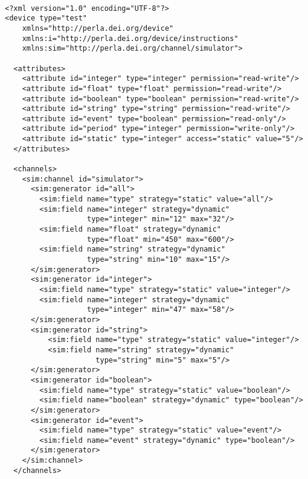 ~\\
\lstset{language=XML}
\begin{lstlisting}
<?xml version="1.0" encoding="UTF-8"?>
<device type="test"
    xmlns="http://perla.dei.org/device"
    xmlns:i="http://perla.dei.org/device/instructions"
    xmlns:sim="http://perla.dei.org/channel/simulator">

  <attributes>
    <attribute id="integer" type="integer" permission="read-write"/>
    <attribute id="float" type="float" permission="read-write"/>
    <attribute id="boolean" type="boolean" permission="read-write"/>
    <attribute id="string" type="string" permission="read-write"/>
    <attribute id="event" type="boolean" permission="read-only"/>
    <attribute id="period" type="integer" permission="write-only"/>
    <attribute id="static" type="integer" access="static" value="5"/>
  </attributes>

  <channels>
    <sim:channel id="simulator">
      <sim:generator id="all">
        <sim:field name="type" strategy="static" value="all"/>
        <sim:field name="integer" strategy="dynamic"
                   type="integer" min="12" max="32"/>
        <sim:field name="float" strategy="dynamic"
                   type="float" min="450" max="600"/>
        <sim:field name="string" strategy="dynamic"
                   type="string" min="10" max="15"/>
      </sim:generator>
      <sim:generator id="integer">
        <sim:field name="type" strategy="static" value="integer"/>
        <sim:field name="integer" strategy="dynamic"
                   type="integer" min="47" max="58"/>
      </sim:generator>
      <sim:generator id="string">
          <sim:field name="type" strategy="static" value="integer"/>
          <sim:field name="string" strategy="dynamic"
                     type="string" min="5" max="5"/>
      </sim:generator>
      <sim:generator id="boolean">
        <sim:field name="type" strategy="static" value="boolean"/>
        <sim:field name="boolean" strategy="dynamic" type="boolean"/>
      </sim:generator>
      <sim:generator id="event">
        <sim:field name="type" strategy="static" value="event"/>
        <sim:field name="event" strategy="dynamic" type="boolean"/>
      </sim:generator>
    </sim:channel>
  </channels>


\end{lstlisting}
